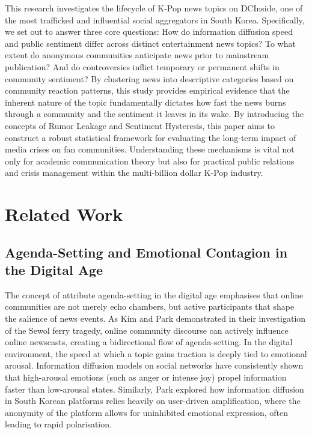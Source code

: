 \documentclass[9pt,twoside,lineno]{pnas-new}
\begin{document}
\begin{article}
This research investigates the lifecycle of K-Pop news topics on DCInside, one of the most trafficked and influential social aggregators in South Korea. Specifically, we set out to answer three core questions: How do information diffusion speed and public sentiment differ across distinct entertainment news topics? To what extent do anonymous communities anticipate news prior to mainstream publication? And do controversies inflict temporary or permanent shifts in community sentiment? By clustering news into descriptive categories based on community reaction patterns, this study provides empirical evidence that the inherent nature of the topic fundamentally dictates how fast the news burns through a community and the sentiment it leaves in its wake. By introducing the concepts of Rumor Leakage and Sentiment Hysteresis, this paper aims to construct a robust statistical framework for evaluating the long-term impact of media crises on fan communities. Understanding these mechanisms is vital not only for academic communication theory but also for practical public relations and crisis management within the multi-billion dollar K-Pop industry.

\section*{Related Work}

\subsection*{Agenda-Setting and Emotional Contagion in the Digital Age}
The concept of attribute agenda-setting in the digital age emphasises that online communities are not merely echo chambers, but active participants that shape the salience of news events. As Kim and Park \cite{kim2017sewol} demonstrated in their investigation of the Sewol ferry tragedy, online community discourse can actively influence online newscasts, creating a bidirectional flow of agenda-setting. In the digital environment, the speed at which a topic gains traction is deeply tied to emotional arousal. Information diffusion models on social networks have consistently shown that high-arousal emotions (such as anger or intense joy) propel information faster than low-arousal states. Similarly, Park \cite{korfin_community} explored how information diffusion in South Korean platforms relies heavily on user-driven amplification, where the anonymity of the platform allows for uninhibited emotional expression, often leading to rapid polarisation.


\end{article}
\end{document}
